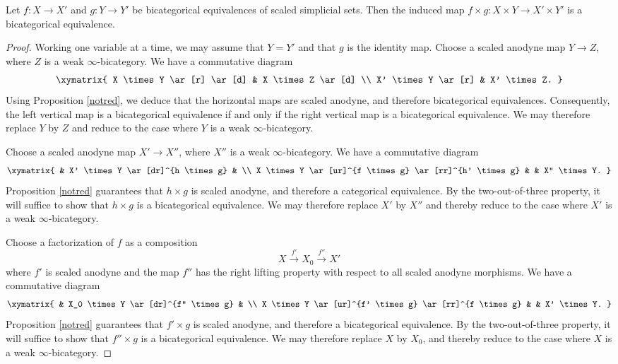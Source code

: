 \begin{lemma}\label{carpus}
Let $f: X \rightarrow X'$ and $g: Y \rightarrow Y'$ be bicategorical equivalences of scaled simplicial sets. Then the induced map $f \times g: X \times Y \rightarrow X' \times Y'$ is a bicategorical equivalence.
\end{lemma}

\begin{proof}
Working one variable at a time, we may assume that $Y = Y'$ and that $g$ is the identity map.
Choose a scaled anodyne map $Y \rightarrow Z$, where $Z$ is a weak $\infty$-bicategory.
We have a commutative diagram
$$ \xymatrix{ X \times Y \ar[r] \ar[d] & X \times Z \ar[d] \\
X' \times Y \ar[r] & X' \times Z. }$$
Using Proposition \ref{notred}, we deduce that the horizontal maps are scaled anodyne, and therefore bicategorical equivalences. Consequently, the left vertical map is a bicategorical equivalence if and only if the right vertical map is a bicategorical equivalence. We may therefore replace $Y$ by $Z$ and reduce to the case where $Y$ is a weak $\infty$-bicategory.

Choose a scaled anodyne map $X' \rightarrow X''$, where $X''$ is a weak $\infty$-bicategory.
We have a commutative diagram
$$ \xymatrix{ & X' \times Y \ar[dr]^{h \times g} & \\
X \times Y \ar[ur]^{f \times g} \ar[rr]^{h' \times g} & & X'' \times Y. }$$
Proposition \ref{notred} guarantees that $h \times g$ is scaled anodyne, and therefore a categorical equivalence. By the two-out-of-three property, it will suffice to show that $h \times g$ is a bicategorical equivalence. We may therefore replace $X'$ by $X''$ and thereby reduce to the case where $X'$ is a weak $\infty$-bicategory.

Choose a factorization of $f$ as a composition
$$ X \stackrel{f'}{\rightarrow} X_0 \stackrel{f''}{\rightarrow} X'$$
where $f'$ is scaled anodyne and the map $f''$ has the right lifting property with respect to all scaled anodyne morphisms. We have a commutative diagram
$$ \xymatrix{ & X_0 \times Y \ar[dr]^{f'' \times g} & \\
X \times Y \ar[ur]^{f' \times g} \ar[rr]^{f \times g} & & X' \times Y. }$$
Proposition \ref{notred} guarantees that $f' \times g$ is scaled anodyne, and therefore a bicategorical equivalence. By the two-out-of-three property, it will suffice to show that $f'' \times g$ is a bicategorical equivalence. We may therefore replace $X$ by $X_0$, and thereby reduce to the case where
$X$ is a weak $\infty$-bicategory.


\end{proof}

